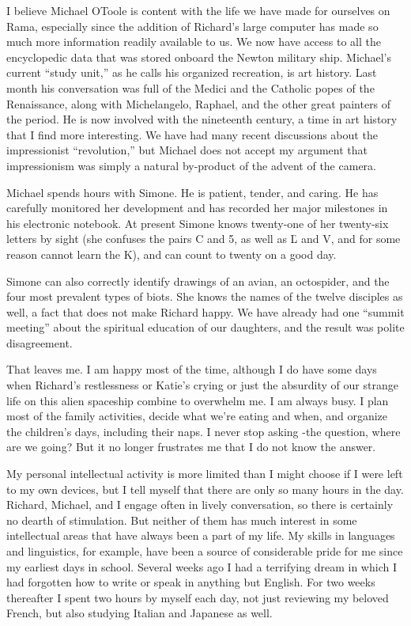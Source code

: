 \documentclass[]{article}
\begin{document}
I believe Michael OToole is content with the life we have made for ourselves on Rama, especially since the addition of Richard’s large computer has made so much more information readily available to us.  We now have access to all the encyclopedic data that was stored onboard the Newton military ship.  Michael’s current “study unit,” as he calls his organized recreation, is art history.  Last month his conversation was full of the Medici and the Catholic popes of the Renaissance, along with Michelangelo, Raphael, and the other great painters of the period.  He is now involved with the nineteenth century, a time in art history that I find more interesting.  We have had many recent discussions about the impressionist “revolution,” but Michael does not accept my argument that impressionism was simply a natural by-product of the advent of the camera.

Michael spends hours with Simone.  He is patient, tender, and caring.  He has carefully monitored her development and has recorded her major milestones in his electronic notebook.  At present Simone knows twenty-one of her twenty-six letters by sight (she confuses the pairs C and 5, as well as Ľ and V, and for some reason cannot learn the K), and can count to twenty on a good day.

Simone can also correctly identify drawings of an avian, an octospider, and the four most prevalent types of biots.  She knows the names of the twelve disciples as well, a fact that does not make Richard happy.  We have already had one “summit meeting” about the spiritual education of our daughters, and the result was polite disagreement.

That leaves me.  I am happy most of the time, although I do have some days when Richard’s restlessness or Katie’s crying or just the absurdity of our strange life on this alien spaceship combine to overwhelm me.  I am always busy.  I plan most of the family activities, decide what we’re eating and when, and organize the children’s days, including their naps.  I never stop asking -the question, where are we going? But it no longer frustrates me that I do not know the answer.

My personal intellectual activity is more limited than I might choose if I were left to my own devices, but I tell myself that there are only so many hours in the day.  Richard, Michael, and I engage often in lively conversation, so there is certainly no dearth of stimulation.  But neither of them has much interest in some intellectual areas that have always been a part of my life.  My skills in languages and linguistics, for example, have been a source of considerable pride for me since my earliest days in school.  Several weeks ago I had a terrifying dream in which I had forgotten how to write or speak in anything but English.  For two weeks thereafter I spent two hours by myself each day, not just reviewing my beloved French, but also studying Italian and Japanese as well.
\end{document}
